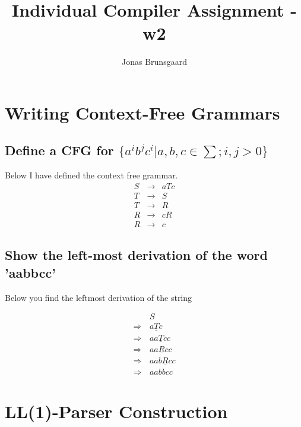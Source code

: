\documentclass[11pt,a4paper]{article}
\title{Individual Compiler Assignment - w2}
\author{Jonas Brunsgaard}
\begin{document}
\maketitle

\section{Writing Context-Free Grammars}

\subsection{Define a CFG for $\{a^i b^j c^i | a, b, c\in \sum; i, j > 0\}$}
Below I have defined the context free grammar.
\begin{eqnarray*}
    S & \rightarrow & aTc \\
    T & \rightarrow & S \\
    T & \rightarrow & R \\
    R & \rightarrow & cR \\
    R & \rightarrow & c
\end{eqnarray*}

\subsection{Show the left-most derivation of the word 'aabbcc'}
Below you find the leftmost derivation of the string

\begin{align*}
    \, & S\\
    \Rightarrow\, & a\underline{T}c\\
    \Rightarrow\, & aa\underline{T}cc\\
    \Rightarrow\, & aa\underline{R}cc\\
    \Rightarrow\, & aab\underline{R}cc\\
    \Rightarrow\, & aabbcc
\end{align*}

\section{LL(1)-Parser Construction}
\end{document}

